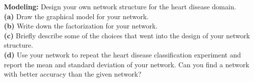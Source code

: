 \documentclass[11pt]{article}
\begin{document}
\begin{problem}{15} \textbf{Modeling:} Design your own network structure for the heart disease domain. \\

\textbf{(a)} Draw the graphical model for your network. \\

\textbf{(b)} Write down the factorization for your network.\\

\textbf{(c)} Briefly describe some of the choices that went into the design of your network structure.\\

\textbf{(d)} Use your network to repeat the heart disease classification experiment and report the mean and standard deviation of your network. Can you find a network with better accuracy than the given network?
\end{problem}

\showpoints
\end{document}
